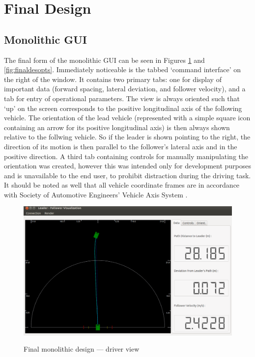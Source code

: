 \documentclass[12pt]{report}
\begin{document}
\section{Final Design} \label{sec:finaldes}

\subsection{Monolithic GUI} \label{sec:finaldes_monolith}
The final form of the monolithic GUI can be seen in Figures \ref{fig:finaldesdriv_monolith} and \ref{fig:finaldesopts}. Immediately noticeable is the tabbed `command interface' on the right of the window. It contains two primary tabs: one for display of important data (forward spacing, lateral deviation, and follower velocity), and a tab for entry of operational parameters. The view is always oriented such that `up' on the screen corresponds to the positive longitudinal axis of the following vehicle. The orientation of the lead vehicle (represented with a simple square icon containing an arrow for its positive longitudinal axis) is then always shown relative to the follwing vehicle. So if the leader is shown pointing to the right, the direction of its motion is then parallel to the follower's lateral axis and in the positive direction. A third tab containing controls for manually manipulating the orientation was created, however this was intended only for development purposes and is unavailable to the end user, to prohibit distraction during the driving task. It should be noted as well that all vehicle coordinate frames are in accordance with Society of Automotive Engineers' Vehicle Axis System \cite{vdbook}.

\begin{figure}[ht] \centering \label{fig:finaldesdriv_monolith}
    \includegraphics[width=5in]{./figs/final_design_data.png}
    \caption{Final monolithic design --- driver view}
\end{figure}
\end{document}
